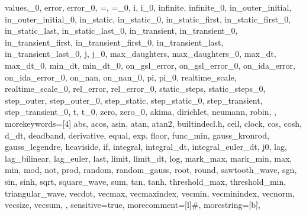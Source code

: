 {{      values,_0,
      error,
      error_0,
      =,
      =_0,
      i,
      i_0,
      infinite,
      infinite_0,
      in_outer_initial,
      in_outer_initial_0,
      in_static,
      in_static_0,
      in_static_first,
      in_static_first_0,
      in_static_last,
      in_static_last_0,
      in_transient,
      in_transient_0,
      in_transient_first,
      in_transient_first_0,
      in_transient_last,
      in_transient_last_0,
      j,
      j_0,
      max_daughters,
      max_daughters_0,
      max_dt,
      max_dt_0,
      min_dt,
      min_dt_0,
      on_gsl_error,
      on_gsl_error_0,
      on_ida_error,
      on_ida_error_0,
      on_nan,
      on_nan_0,
      pi,
      pi_0,
      realtime_scale,
      realtime_scale_0,
      rel_error,
      rel_error_0,
      static_steps,
      static_steps_0,
      step_outer,
      step_outer_0,
      step_static,
      step_static_0,
      step_transient,
      step_transient_0,
      t,
      t_0,
      zero,
      zero_0,
      akima,
      dirichlet,
      neumann,
      robin,
},
morekeywords={[4]
      abs,
      acos,
      asin,
      atan,
      atan2,
      builtindecl.h,
      ceil,
      clock,
      cos,
      cosh,
      d_dt,
      deadband,
      derivative,
      equal,
      exp,
      floor,
      func_min,
      gauss_kronrod,
      gauss_legendre,
      heaviside,
      if,
      integral,
      integral_dt,
      integral_euler_dt,
      j0,
      lag,
      lag_bilinear,
      lag_euler,
      last,
      limit,
      limit_dt,
      log,
      mark_max,
      mark_min,
      max,
      min,
      mod,
      not,
      prod,
      random,
      random_gauss,
      root,
      round,
      sawtooth_wave,
      sgn,
      sin,
      sinh,
      sqrt,
      square_wave,
      sum,
      tan,
      tanh,
      threshold_max,
      threshold_min,
      triangular_wave,
      vecdot,
      vecmax,
      vecmaxindex,
      vecmin,
      vecminindex,
      vecnorm,
      vecsize,
      vecsum,
},
sensitive=true,
morecomment=[l]{\#},
morestring=[b]\",
}

\newcommand{\MyHookSign}{\hbox{\ensuremath{\hookleftarrow}}}



